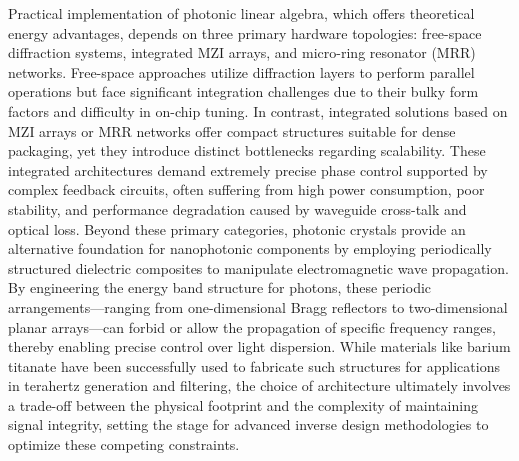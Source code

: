 \documentclass[11pt]{article}
\begin{document}
Practical implementation of photonic linear algebra, which offers theoretical energy advantages, depends on three primary hardware topologies: free-space diffraction systems, integrated MZI arrays, and micro-ring resonator (MRR) networks. Free-space approaches utilize diffraction layers to perform parallel operations but face significant integration challenges due to their bulky form factors and difficulty in on-chip tuning. In contrast, integrated solutions based on MZI arrays or MRR networks offer compact structures suitable for dense packaging, yet they introduce distinct bottlenecks regarding scalability. These integrated architectures demand extremely precise phase control supported by complex feedback circuits, often suffering from high power consumption, poor stability, and performance degradation caused by waveguide cross-talk and optical loss. Beyond these primary categories, photonic crystals provide an alternative foundation for nanophotonic components by employing periodically structured dielectric composites to manipulate electromagnetic wave propagation. \citep{doi_10_71465_gmssrj79_3a431fc8} \citep{doi_10_3390_axioms14060445_76ffad4a} By engineering the energy band structure for photons, these periodic arrangements---ranging from one-dimensional Bragg reflectors to two-dimensional planar arrays---can forbid or allow the propagation of specific frequency ranges, thereby enabling precise control over light dispersion. \citep{doi_10_4302_plp_v17i4_1361_327bd6c2} \citep{doi_10_1149_ma2026_01231276mtgabs_21448056} While materials like barium titanate have been successfully used to fabricate such structures for applications in terahertz generation and filtering, the choice of architecture ultimately involves a trade-off between the physical footprint and the complexity of maintaining signal integrity, setting the stage for advanced inverse design methodologies to optimize these competing constraints. \citep{doi_10_1088_1402_4896_ae8345_3b948559} \citep{doi_10_1002_adom_202001249_3b8c9743}
\end{document}
